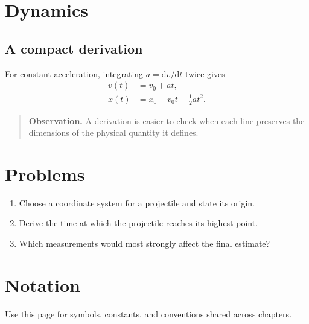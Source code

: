 \documentclass[11pt,twoside]{book}
\begin{document}
\chapter{Dynamics}
\section{A compact derivation}
For constant acceleration, integrating $a=\mathrm{d}v/\mathrm{d}t$ twice gives
\begin{align}
v(t)&=v_0+at,\\
x(t)&=x_0+v_0t+\tfrac12at^2.
\end{align}
\begin{quote}
\textbf{Observation.} A derivation is easier to check when each line preserves
the dimensions of the physical quantity it defines.
\end{quote}
\chapter{Problems}
\begin{enumerate}
  \item Choose a coordinate system for a projectile and state its origin.
  \item Derive the time at which the projectile reaches its highest point.
  \item Which measurements would most strongly affect the final estimate?
\end{enumerate}
\backmatter
\chapter*{Notation}
Use this page for symbols, constants, and conventions shared across chapters.
\end{document}
